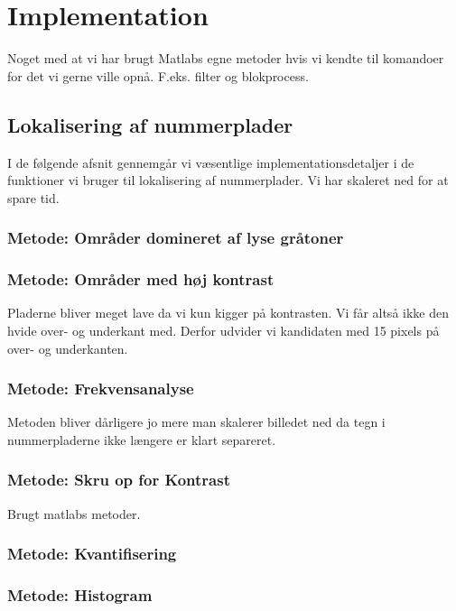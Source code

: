 \section{Implementation}
\label{sec_implementation}
Noget med at vi har brugt Matlabs egne metoder hvis vi kendte til komandoer for det vi gerne ville opnå. F.eks. filter og blokprocess.

\subsection{Lokalisering af nummerplader}
I de følgende afsnit gennemgår vi væsentlige implementationsdetaljer i de funktioner vi bruger til lokalisering af nummerplader. Vi har skaleret ned for at spare tid.

\subsubsection{Metode: Områder domineret af lyse gråtoner}

\subsubsection{Metode: Områder med høj kontrast}
Pladerne bliver meget lave da vi kun kigger på kontrasten. Vi får altså ikke den hvide over- og underkant med. Derfor udvider vi kandidaten med 15 pixels på over- og underkanten. 

\subsubsection{Metode: Frekvensanalyse}
Metoden bliver dårligere jo mere man skalerer billedet ned da tegn i nummerpladerne ikke længere er klart separeret.

\subsubsection{Metode: Skru op for Kontrast}
Brugt matlabs metoder.

\subsubsection{Metode: Kvantifisering}


\subsubsection{Metode: Histogram}




